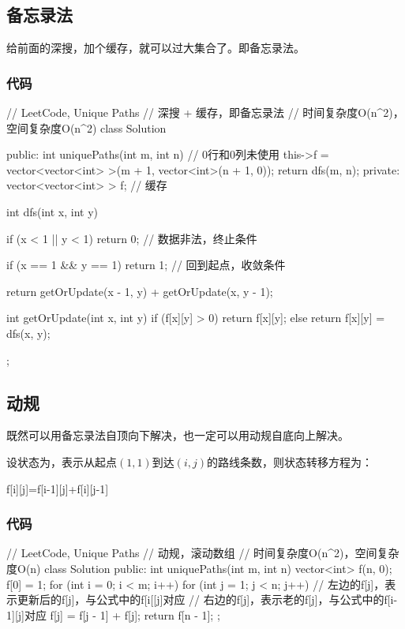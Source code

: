 \subsection{备忘录法}
给前面的深搜，加个缓存，就可以过大集合了。即备忘录法。

\subsubsection{代码}
\begin{Code}
// LeetCode, Unique Paths
// 深搜 + 缓存，即备忘录法
// 时间复杂度O(n^2)，空间复杂度O(n^2)
class Solution {
public:
    int uniquePaths(int m, int n) {
        // 0行和0列未使用
        this->f = vector<vector<int> >(m + 1, vector<int>(n + 1, 0));
        return dfs(m, n);
    }
private:
    vector<vector<int> > f;  // 缓存

    int dfs(int x, int y) {
        if (x < 1 || y < 1) return 0; // 数据非法，终止条件

        if (x == 1 && y == 1) return 1; // 回到起点，收敛条件

        return getOrUpdate(x - 1, y) + getOrUpdate(x, y - 1);
    }

    int getOrUpdate(int x, int y) {
        if (f[x][y] > 0) return f[x][y];
        else return f[x][y] = dfs(x, y);
    }
};
\end{Code}


\subsection{动规}
既然可以用备忘录法自顶向下解决，也一定可以用动规自底向上解决。

设状态为，表示从起点$(1,1)$到达$(i,j)$的路线条数，则状态转移方程为：
\begin{Code}
f[i][j]=f[i-1][j]+f[i][j-1]
\end{Code}


\subsubsection{代码}
\begin{Code}
// LeetCode, Unique Paths
// 动规，滚动数组
// 时间复杂度O(n^2)，空间复杂度O(n)
class Solution {
public:
    int uniquePaths(int m, int n) {
        vector<int> f(n, 0);
        f[0] = 1;
        for (int i = 0; i < m; i++) {
            for (int j = 1; j < n; j++) {
                // 左边的f[j]，表示更新后的f[j]，与公式中的f[i[[j]对应
                // 右边的f[j]，表示老的f[j]，与公式中的f[i-1][j]对应
                f[j] = f[j - 1] + f[j];
            }
        }
        return f[n - 1];
    }
};
\end{Code}


